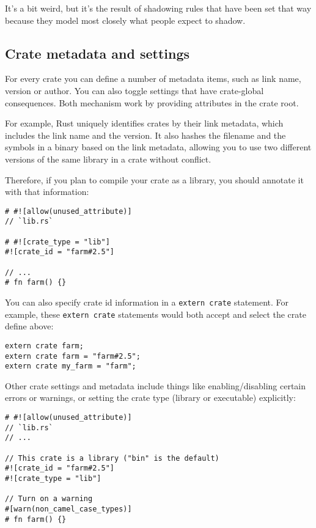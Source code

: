 \documentclass[]{article}
\begin{document}
It's a bit weird, but it's the result of shadowing rules that have been
set that way because they model most closely what people expect to
shadow.

\subsection{Crate metadata and
settings}\label{crate-metadata-and-settings}

For every crate you can define a number of metadata items, such as link
name, version or author. You can also toggle settings that have
crate-global consequences. Both mechanism work by providing attributes
in the crate root.

For example, Rust uniquely identifies crates by their link metadata,
which includes the link name and the version. It also hashes the
filename and the symbols in a binary based on the link metadata,
allowing you to use two different versions of the same library in a
crate without conflict.

Therefore, if you plan to compile your crate as a library, you should
annotate it with that information:

\begin{verbatim}
# #![allow(unused_attribute)]
// `lib.rs`

# #![crate_type = "lib"]
#![crate_id = "farm#2.5"]

// ...
# fn farm() {}
\end{verbatim}

You can also specify crate id information in a \texttt{extern crate}
statement. For example, these \texttt{extern crate} statements would
both accept and select the crate define above:

\begin{verbatim}
extern crate farm;
extern crate farm = "farm#2.5";
extern crate my_farm = "farm";
\end{verbatim}

Other crate settings and metadata include things like enabling/disabling
certain errors or warnings, or setting the crate type (library or
executable) explicitly:

\begin{verbatim}
# #![allow(unused_attribute)]
// `lib.rs`
// ...

// This crate is a library ("bin" is the default)
#![crate_id = "farm#2.5"]
#![crate_type = "lib"]

// Turn on a warning
#[warn(non_camel_case_types)]
# fn farm() {}
\end{verbatim}
\end{document}
